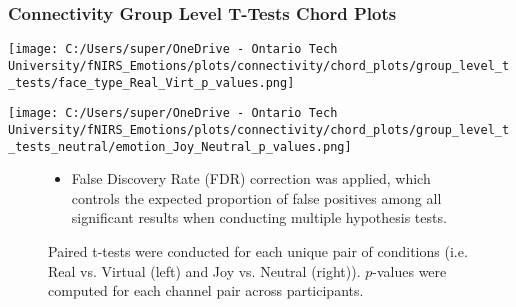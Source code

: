 \documentclass{beamer}
\begin{document}
\begin{frame}
    \frametitle{Connectivity Group Level T-Tests Chord Plots}
    \begin{minipage}[t]{0.45\textwidth}
        \vspace{-\baselineskip}
        \texttt{[image: C:/Users/super/OneDrive - Ontario Tech University/fNIRS\_Emotions/plots/connectivity/chord\_plots/group\_level\_t\_tests/face\_type\_Real\_Virt\_p\_values.png]}
    \end{minipage}
    \begin{minipage}[t]{0.45\textwidth}
        \vspace{-\baselineskip}
        \texttt{[image: C:/Users/super/OneDrive - Ontario Tech University/fNIRS\_Emotions/plots/connectivity/chord\_plots/group\_level\_t\_tests\_neutral/emotion\_Joy\_Neutral\_p\_values.png]}
    \end{minipage}
    \begin{figure}
        \caption{Paired t-tests were conducted for each unique pair of conditions (i.e. Real vs. Virtual (left) and Joy vs. Neutral (right)).
        $p$-values were computed for each channel pair across participants. }
        \begin{itemize}
            \item False Discovery Rate (FDR) correction was applied, which controls the expected proportion of false positives among all significant results when conducting multiple hypothesis tests.
        \end{itemize}
    \end{figure}
\end{frame}
\end{document}
